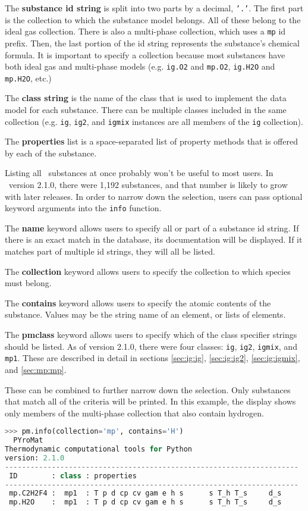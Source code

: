 The {\bf substance id string} is split into two parts by a decimal, \texttt{'.'}.  The first part is the collection to which the substance model belongs.  All of these belong to the ideal gas collection.  There is also a multi-phase collection, which uses a \texttt{mp} id prefix.  Then, the last portion of the id string represents the substance's chemical formula.  It is important to specify a collection because most substances have both ideal gas and multi-phase models (e.g. \texttt{ig.O2} and \texttt{mp.O2}, \texttt{ig.H2O} and \texttt{mp.H2O}, etc.)

The {\bf class string} is the name of the class that is used to implement the data model for each substance.  There can be multiple classes included in the same collection (e.g. \texttt{ig}, \texttt{ig2}, and \texttt{igmix} instances are all members of the \texttt{ig} collection).

The {\bf properties} list is a space-separated list of property methods that is offered by each of the substance.  

Listing all \PM\ substances at once probably won't be useful to most users.  In \PM\ version 2.1.0, there were 1,192 substances, and that number is likely to grow with later releases.  In order to narrow down the selection, users can pass optional keyword arguments into the \texttt{info} function. 

The {\bf name} keyword allows users to specify all or part of a substance id string.  If there is an exact match in the database, its documentation will be displayed.  If it matches part of multiple id strings, they will all be listed.

The {\bf collection} keyword allows users to specify the collection to which species must belong.

The {\bf contains} keyword allows users to specify the atomic contents of the substance.  Values may be the string name of an element, or lists of elements.

The {\bf pmclass} keyword allows users to specify which of the class specifier strings should be listed.  As of version 2.1.0, there were four classes: \texttt{ig}, \texttt{ig2}, \texttt{igmix}, and \texttt{mp1}.  These are described in detail in sections \ref{sec:ig:ig}, \ref{sec:ig:ig2}, \ref{sec:ig:igmix}, and \ref{sec:mp:mp}.

These can be combined to further narrow down the selection.  Only substances that match all of the criteria will be printed.  In this example, the display shows only members of the multi-phase collection that also contain hydrogen.
\begin{lstlisting}[language=Python,style=tinystyle]
>>> pm.info(collection='mp', contains='H')
  PYroMat
Thermodynamic computational tools for Python
version: 2.1.0
---------------------------------------------------------------------
 ID        : class : properties
---------------------------------------------------------------------
 mp.C2H2F4 :  mp1  : T p d cp cv gam e h s      s T_h T_s     d_s    
 mp.H2O    :  mp1  : T p d cp cv gam e h s      s T_h T_s     d_s    
\end{lstlisting}

